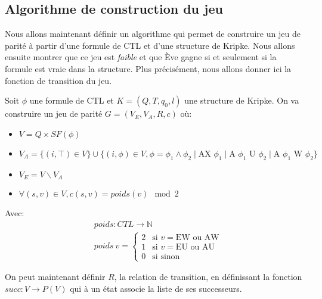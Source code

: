 \documentclass[10pt,a4paper]{article}
\begin{document}
\subsection{Algorithme de construction du jeu}
Nous allons maintenant définir un algorithme qui permet de construire un jeu de parité à partir d'une formule de CTL et d'une structure de Kripke. Nous allons ensuite montrer que ce jeu est \emph{faible} et que Ève gagne si et seulement si la formule est vraie dans la structure. Plus précisément, nous allons donner ici la fonction de transition du jeu.

Soit $\phi$ une formule de CTL et $K = (Q,T,q_0,l)$  une structure de Kripke.
On va construire un jeu de parité $G = (V_E,V_A,R,c)$ où:
\begin{itemize}
	\item $V = Q \times SF(\phi)$
	\item $V_A = \{(i, \top ) \in V\} \cup \{(i, \phi) \in V, \phi = \phi_1 \land \phi_2 \mid \mbox{AX } \phi_1\mid \mbox{A } \phi_1 \mbox{ U } \phi_2 \mid \mbox{A } \phi_1 \mbox{ W } \phi_2\}$
	\item $V_E = V \backslash V_A$
	\item $\forall (s,v) \in V, c(s,v) = poids(v) \mod 2$
\end{itemize}
Avec:
\begin{align*}
&poids : CTL \to \mathbb{N} \\
&poids\ v =
  \begin{cases}
    2 &\mbox{si } v = \mbox{EW ou AW} \\
    1 &\mbox{si } v = \mbox{EU ou AU} \\
    0 &\mbox{si } \mbox{sinon}
  \end{cases}
\end{align*}

On peut maintenant définir $R$, la relation de transition, en définissant la fonction $succ : V \to P(V)$ qui à un état associe la liste de ses successeurs.\\
\end{document}
